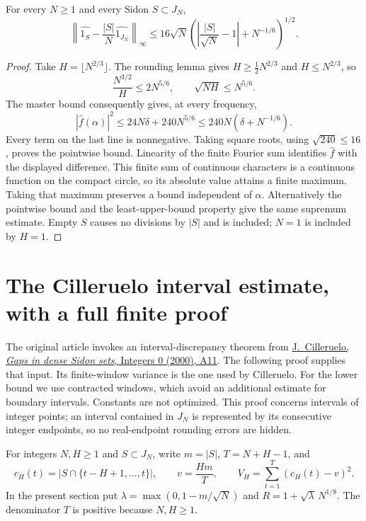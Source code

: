 \begin{theorem}
\leanok
\label{core:fourier-uniformity}
For every $N\geq1$ and every Sidon $S\subset J_N$,
\[
 \left\|\widehat{1_S}-\frac{|S|}{N}\widehat{1_{J_N}}\right\|_\infty
 \leq16\sqrt N
       \left(\left|\frac{|S|}{\sqrt N}-1\right|+N^{-1/6}\right)^{1/2}.
\]
\end{theorem}
\begin{proof}
Take $H=\lfloor N^{2/3}\rfloor$.  The rounding lemma gives
$H\geq\frac12N^{2/3}$ and $H\leq N^{2/3}$, so
\[
 \frac{N^{3/2}}H\leq2N^{5/6},\qquad
 \sqrt{NH}\leq N^{5/6}.
\]
The master bound consequently gives, at every frequency,
\[
 |\widehat f(\alpha)|^2
 \leq24N\delta+240N^{5/6}
 \leq240N(\delta+N^{-1/6}).
\]
Every term on the last line is nonnegative.  Taking square roots,
using $\sqrt{240}\leq16$, proves the pointwise bound.
Linearity of the finite Fourier sum identifies $\widehat f$ with
the displayed difference.  This finite sum of continuous
characters is a continuous function on the compact circle, so
its absolute value attains a finite maximum.  Taking that maximum
preserves a bound independent of $\alpha$.  Alternatively the
pointwise bound and the least-upper-bound property give the same
supremum estimate.  Empty $S$ causes no divisions by $|S|$ and is
included; $N=1$ is included by $H=1$.
\end{proof}

\section{The Cilleruelo interval estimate, with a full finite proof}

The original article invokes an interval-discrepancy theorem from
\href{https://math.colgate.edu/~integers/a11/a11.pdf}{J.~Cilleruelo,
\emph{Gaps in dense Sidon sets}, Integers 0 (2000), A11}.
The following proof supplies that input.  Its finite-window variance
is the one used by Cilleruelo.  For the lower bound we use contracted
windows, which avoid an additional estimate for boundary intervals.
Constants are not optimized.  This proof concerns intervals of integer
points; an interval contained in $J_N$ is represented by its consecutive
integer endpoints, so no real-endpoint rounding errors are hidden.

\begin{definition}
\label{core:window-variance-definition}
For integers $N,H\geq1$ and $S\subset J_N$, write $m=|S|$,
$T=N+H-1$, and
\[
 c_H(t)=|S\cap\{t-H+1,\ldots,t\}|,\qquad
 v=\frac{Hm}{T},\qquad
 V_H=\sum_{t=1}^{T}(c_H(t)-v)^2.
\]
In the present section put
$\lambda=\max(0,1-m/\sqrt N)$ and
$R=1+\sqrt\lambda\,N^{1/8}$.
The denominator $T$ is positive because $N,H\geq1$.
\end{definition}


